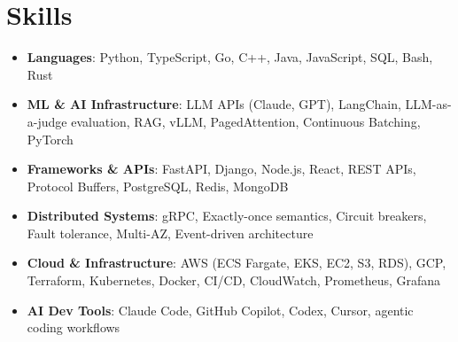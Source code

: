 \documentclass[letterpaper,11pt]{article}
\newcommand{\resumeSubHeadingListStart}{\begin{itemize}[leftmargin=0.15in, label={}]}
\newcommand{\resumeSubHeadingListEnd}{\end{itemize}}
\newcommand{\resumeSkillHeading}[2]{%
  \item\small{\textbf{#1}: #2 \vspace{-9pt}}%
}
\begin{document}
\section{Skills}
  \resumeSubHeadingListStart
    \resumeSkillHeading{Languages}{Python, TypeScript, Go, C++, Java, JavaScript, SQL, Bash, Rust}
    \resumeSkillHeading{ML \& AI Infrastructure}{LLM APIs (Claude, GPT), LangChain, LLM-as-a-judge evaluation, RAG, vLLM, PagedAttention, Continuous Batching, PyTorch}
    \resumeSkillHeading{Frameworks \& APIs}{FastAPI, Django, Node.js, React, REST APIs, Protocol Buffers, PostgreSQL, Redis, MongoDB}
    \resumeSkillHeading{Distributed Systems}{gRPC, Exactly-once semantics, Circuit breakers, Fault tolerance, Multi-AZ, Event-driven architecture}
    \resumeSkillHeading{Cloud \& Infrastructure}{AWS (ECS Fargate, EKS, EC2, S3, RDS), GCP, Terraform, Kubernetes, Docker, CI/CD, CloudWatch, Prometheus, Grafana}
    \resumeSkillHeading{AI Dev Tools}{Claude Code, GitHub Copilot, Codex, Cursor, agentic coding workflows}
  \resumeSubHeadingListEnd
\end{document}
